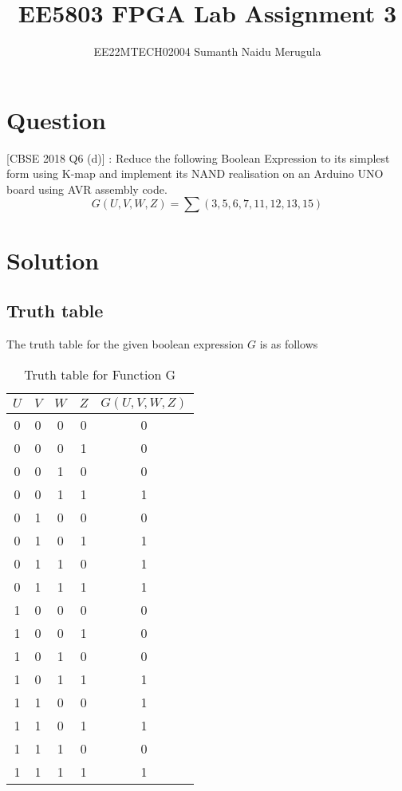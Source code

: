 \documentclass[14pt]{article}
\title{EE5803 FPGA Lab Assignment 3}
\author{EE22MTECH02004  Sumanth Naidu Merugula}
\begin{document}
\maketitle
\section{Question}
[CBSE 2018 Q6 (d)] : Reduce the following Boolean Expression to its simplest form using K-map and implement its NAND realisation on an Arduino UNO board using AVR assembly code.  
\begin{equation}
G(U,V,W,Z)=\sum(3,5,6,7,11,12,13,15) 
\end{equation}
\section{Solution}
\subsection{Truth table}
The truth table for the given boolean expression $G$ is as follows
\begin{table}[h!]
\centering
\begin{tabular}{|c|c|c|c|c|} 
\hline
$U$ & $V$ & $W$  & $Z$ & $G(U,V,W,Z)$  \\ 
\hline
0 & 0 & 0 & 0 & 0     \\ 
\hline
0 & 0 & 0 & 1 & 0     \\ 
\hline
0 & 0 & 1 & 0 & 0     \\ 
\hline
0 & 0 & 1 & 1 & 1     \\ 
\hline
0 & 1 & 0 & 0 & 0     \\ 
\hline
0 & 1 & 0 & 1 & 1     \\ 
\hline
0 & 1 & 1 & 0 & 1     \\ 
\hline
0 & 1 & 1 & 1 & 1     \\ 
\hline
1 & 0 & 0 & 0 & 0     \\ 
\hline
1 & 0 & 0 & 1 & 0     \\ 
\hline
1 & 0 & 1 & 0 & 0     \\ 
\hline
1 & 0 & 1 & 1 & 1     \\ 
\hline
1 & 1 & 0 & 0 & 1     \\ 
\hline
1 & 1 & 0 & 1 & 1     \\ 
\hline
1 & 1 & 1 & 0 & 0     \\ 
\hline
1 & 1 & 1 & 1 & 1     \\ 
\hline
\end{tabular}
\caption{Truth table for Function G}
\end{table}
\end{document}
